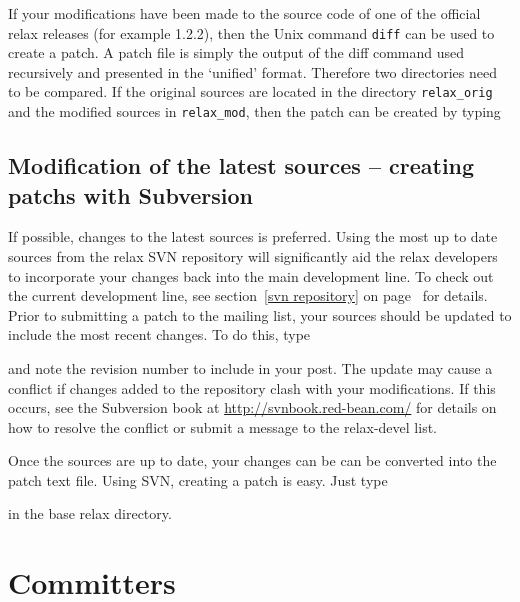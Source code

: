 If your modifications have been made to the source code of one of the official relax releases (for example 1.2.2), then the Unix command \texttt{diff} can be used to create a patch.  A patch file is simply the output of the diff command used recursively and presented in the `unified' format.  Therefore two directories need to be compared.  If the original sources are located in the directory \texttt{relax\_orig} and the modified sources in \texttt{relax\_mod}, then the patch can be created by typing



\subsection{Modification of the latest sources -- creating patchs with Subversion}

If possible, changes to the latest sources is preferred.  Using the most up to date sources from the relax SVN repository will significantly aid the relax developers to incorporate your changes back into the main development line.  To check out the current development line, see section~\ref{svn repository} on page~\pageref{svn repository} for details.  Prior to submitting a patch to the mailing list, your sources should be updated to include the most recent changes.  To do this, type


and note the revision number to include in your post.  The update may cause a conflict if changes added to the repository clash with your modifications.  If this occurs, see the Subversion book at \href{http://svnbook.red-bean.com/}{http://svnbook.red-bean.com/} for details on how to resolve the conflict or submit a message to the relax-devel list.

Once the sources are up to date, your changes can be can be converted into the patch text file.  Using SVN, creating a patch is easy.  Just type


in the base relax directory.




\section{Committers}


